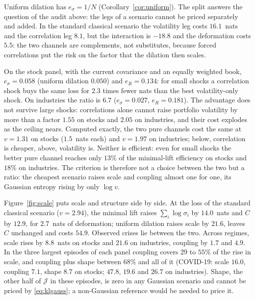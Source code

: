 \documentclass[12pt]{article}
\theoremstyle{definition}
\theoremstyle{remark}
\newcommand{\JJ}{\mathcal{J}}
\begin{document}
\begin{doublespace}
Uniform dilation has $e_\sigma=1/N$ (Corollary~\ref{cor:uniform}). The split
answers the question of the audit above: the legs of a scenario cannot be
priced separately and added. In the standard classical scenario the
volatility leg costs $16.1$~nats and the correlation leg $8.1$, but the
interaction is $-18.8$ and the deformation costs $5.5$: the two channels are
complements, not substitutes, because forced correlations put the risk on the
factor that the dilation then scales.

On the stock panel, with the current covariance and an equally weighted
book, $e_\sigma=0.058$ (uniform dilation $0.050$) and $e_R=0.134$: for small
shocks a correlation shock buys the same loss for $2.3$ times fewer nats than
the best volatility-only shock. On industries the ratio is $6.7$
($e_\sigma=0.027$, $e_R=0.181$). The advantage does not survive large
shocks: correlations alone cannot raise portfolio volatility by more than a
factor $1.55$ on stocks and $2.05$ on industries, and their cost explodes as
the ceiling nears. Computed exactly, the two pure channels cost the same at
$v=1.31$ on stocks ($1.5$~nats each) and $v=1.97$ on industries; below,
correlation is cheaper, above, volatility is. Neither is efficient: even
for small shocks the better pure channel reaches only $13\%$ of the
minimal-lift efficiency on stocks and $18\%$ on industries. The criterion is therefore not a choice
between the two but a ratio: the cheapest scenario raises scale and coupling
almost one for one, its Gaussian entropy rising by only $\log v$.

Figure~\ref{fig:scale} puts scale and structure side by side. At the loss of
the standard classical scenario ($v=2.94$), the minimal lift raises
$\sum_i\log\sigma_i$ by $14.0$~nats and $C$ by $12.9$, for $2.7$~nats of
deformation; uniform dilation raises scale by $21.6$, leaves $C$ unchanged and
costs $54.9$. Observed crises lie between the two. Across regimes, scale
rises by $8.8$~nats on stocks and $21.6$ on industries, coupling by $1.7$ and
$4.9$. In the three largest episodes of each panel coupling covers $29$ to
$55\%$ of the rise in scale, and coupling plus shape between $68\%$ and all
of it (COVID-19: scale $16.0$, coupling $7.1$, shape $8.7$ on stocks; $47.8$,
$19.6$ and $26.7$ on industries). Shape, the other half
of $\JJ$ in these episodes, is zero in any Gaussian scenario and cannot be
priced by \eqref{eq:klgauss}; a non-Gaussian reference would be needed to
price it.


\end{doublespace}
\end{document}
